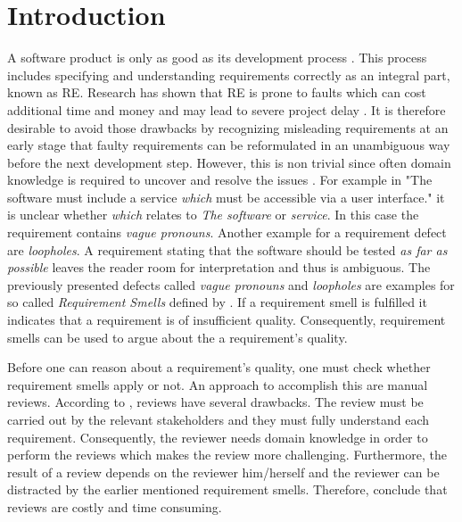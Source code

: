 
\chapter{Introduction}
\label{chp:introduction}

A software product is only as good as its development process \parencite{Hsia:1993}.
This process includes specifying and understanding requirements correctly as an integral part, known as \ac{RE}.
Research has shown that \ac{RE} is prone to faults which can cost additional time and money \parencite{Mendez:2016} and may lead to severe project delay \parencite{Femmer:2014}.
It is therefore desirable to avoid those drawbacks by recognizing misleading requirements at an early stage that faulty requirements can be reformulated in an unambiguous way before the next development step.
However, this is non trivial since often domain knowledge is required to uncover and resolve the issues \parencite{Femmer:2017}.
For example in "The software must include a service \textit{which} must be accessible via a user interface." it is unclear whether \textit{which} relates to \textit{The software} or \textit{service}.
In this case the requirement contains \textit{vague pronouns}.
Another example for a requirement defect are \textit{loopholes}.
A requirement stating that the software should be tested \textit{as far as possible} leaves the reader room for interpretation and thus is ambiguous.
The previously presented defects called \textit{vague pronouns} and \textit{loopholes} are examples for so called \textit{Requirement Smells} defined by \textcite{Femmer:2017}.
If a requirement smell is fulfilled it indicates that a requirement is of insufficient quality.
Consequently, requirement smells can be used to argue about the a requirement's quality.

Before one can reason about a requirement's quality, one must check whether requirement smells apply or not.
An approach to accomplish this are manual reviews.
According to \textcite{Salger:2013}, reviews have several drawbacks.
The review must be carried out by the relevant stakeholders and they must fully understand each requirement.
Consequently, the reviewer needs domain knowledge in order to perform the reviews which makes the review more challenging.
Furthermore, the result of a review depends on the reviewer him/herself \parencite{Zelkowitz:1983} and the reviewer can be distracted by the earlier mentioned requirement smells.
Therefore, \textcite{Femmer:2017} conclude that reviews are costly and time consuming.

